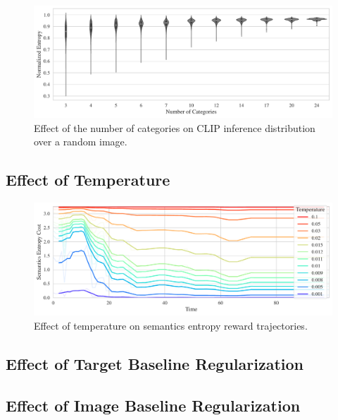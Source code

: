 \begin{figure}[H]
    \centering
    \includegraphics[width=\textwidth]{images/category_comparison_tangram.pdf}
    \caption{Effect of the number of categories on CLIP inference distribution over a random image.}
    \label{fig:clip-categories}
\end{figure}

\subsection{Effect of Temperature}
\label{sec:reg-temperature}
\begin{figure}[H]
    \centering
    \includegraphics[width=\textwidth]{images/temperature_comparison.pdf}
    \caption{Effect of temperature on semantics entropy reward trajectories.}
    \label{fig:clip-temperature}    
\end{figure}

\subsection{Effect of Target Baseline Regularization}
\label{sec:reg-alpha}


\subsection{Effect of Image Baseline Regularization}
\label{sec:reg-beta}


